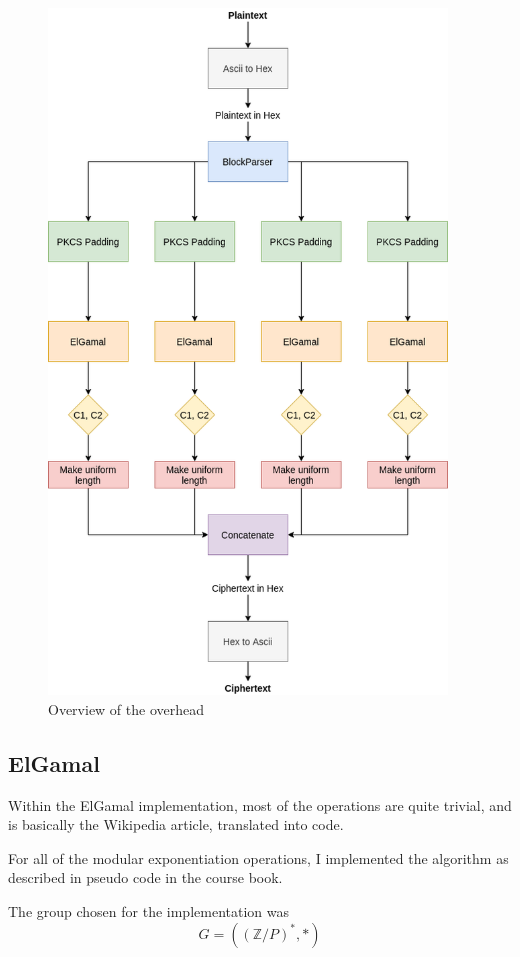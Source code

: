 \documentclass{article}
\begin{document}
\begin{figure}[H]
 \centering
  \includegraphics[width=300pt]{img/overview.png}
 \caption{Overview of the overhead}
 \label{rOVERHEAD}
 \end{figure}

\subsection{ElGamal}

Within the ElGamal implementation, most of the operations are quite trivial, and is basically the Wikipedia article, translated into code.

For all of the modular exponentiation operations, I implemented the algorithm as described in pseudo code in the course book\cite{ROSEN}.

The group chosen for the implementation was
\begin{equation*}
  G =((\mathbb{Z}/P)^{*}, *)
\end{equation*}
\end{document}
